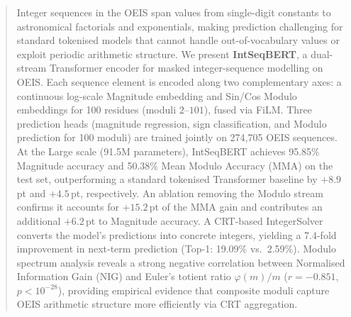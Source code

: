 \documentclass[runningheads]{llncs}
\begin{document}
\begin{abstract}
%
Integer sequences in the OEIS span values from single-digit constants to astronomical
factorials and exponentials, making prediction challenging for standard tokenised models that
cannot handle out-of-vocabulary values or exploit periodic arithmetic structure.
We present \textbf{IntSeqBERT}, a dual-stream Transformer encoder for masked integer-sequence
modelling on OEIS. Each sequence element is encoded along two complementary axes: a continuous
log-scale Magnitude embedding and Sin/Cos Modulo embeddings for 100 residues (moduli
$2$--$101$), fused via FiLM. Three prediction heads (magnitude regression,
sign classification, and Modulo prediction for 100 moduli) are trained jointly
on 274,705 OEIS sequences.
At the Large scale (91.5M parameters), IntSeqBERT achieves 95.85\% Magnitude accuracy and
50.38\% Mean Modulo Accuracy (MMA) on the test set, outperforming a standard tokenised
Transformer baseline by $+8.9$\,pt and $+4.5$\,pt, respectively. An ablation removing the
Modulo stream confirms it accounts for $+15.2$\,pt of the MMA gain and contributes an
additional $+6.2$\,pt to Magnitude accuracy. A CRT-based IntegerSolver converts the model's
predictions into concrete integers, yielding a 7.4-fold improvement in next-term prediction
(Top-1: 19.09\% vs.\ 2.59\%). Modulo spectrum analysis reveals a strong negative correlation
between Normalised Information Gain (NIG) and Euler's totient ratio $\varphi(m)/m$
($r = -0.851$, $p < 10^{-28}$), providing empirical evidence that composite moduli capture
OEIS arithmetic structure more efficiently via CRT aggregation.

\end{abstract}
\end{document}
